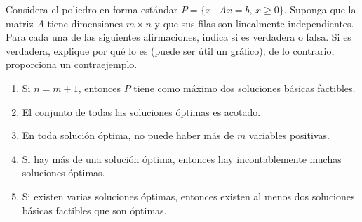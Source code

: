 Considera el poliedro en forma estándar \( P = \{x \mid Ax = b, \, x \geq 0\} \). Suponga que la matriz \( A \) tiene dimensiones \( m \times n \) y que sus filas son linealmente independientes. Para cada una de las siguientes afirmaciones, indica si es verdadera o falsa. Si es verdadera, explique por qué lo es (puede ser útil un gráfico); de lo contrario, proporciona un contraejemplo.

\begin{enumerate}
    \item[(a)] Si \( n = m + 1 \), entonces \( P \) tiene como máximo dos soluciones básicas factibles.
    \item[(b)] El conjunto de todas las soluciones óptimas es acotado.
    \item[(c)] En toda solución óptima, no puede haber más de \( m \) variables positivas.
    \item[(d)] Si hay más de una solución óptima, entonces hay incontablemente muchas soluciones óptimas.
    \item[(e)] Si existen varias soluciones óptimas, entonces existen al menos dos soluciones básicas factibles que son óptimas.

\end{enumerate}

